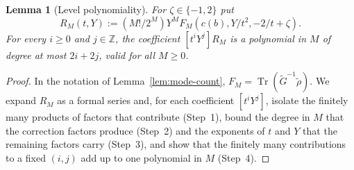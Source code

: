 \documentclass[twoside,10pt]{article}
\numberwithin{equation}{section}
\theoremstyle{slbody}
\newtheorem{lemma}[theorem]{Lemma}
\theoremstyle{definition}
\theoremstyle{remark}
\newcommand{\Tr}{\operatorname{Tr}}
\begin{document}
\begin{lemma}[Level polynomiality]\label{lem:level-poly}
For \(\zeta\in\{-1,2\}\) put
\[
 R_M(t,Y):=(M!/2^M)Y^MF_M(c(b),Y/t^2,-2/t+\zeta).
\]
For every \(i\geq0\) and \(j\in\mathbb Z\), the coefficient \([t^iY^j]R_M\) is a
polynomial in \(M\) of degree at most \(2i+2j\), valid for all \(M\geq0\).
\end{lemma}

\begin{proof}
In the notation of Lemma~\ref{lem:mode-count}, \(F_M=\Tr(\widetilde G^{-1}\widetilde\rho)\).
We expand \(R_M\) as a formal series and, for each coefficient
\([t^iY^j]\), isolate the finitely many products of factors that contribute
(Step~1), bound
the degree in \(M\) that the correction factors produce (Step~2) and the
exponents of \(t\) and \(Y\) that the remaining factors carry (Step~3), and
show that the finitely many contributions to a fixed \((i,j)\) add up to one
polynomial in \(M\) (Step~4).


\end{proof}
\end{document}
